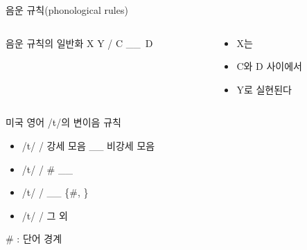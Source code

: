 \documentclass[11pt, aspectratio=169]{beamer}
\newcommand{\textds}[1]{{\ipafont #1}}
\begin{document}
\begin{frame}[t]{음운 규칙(phonological rules)}
    \begin{columns}
        \begin{column}[t]{0.46\textwidth}
            \begin{block}{음운 규칙의 일반화}
                X \rightarrow Y / C \_\_\ D 
            \end{block}            
        \end{column}
        \begin{column}[t]{0.47\textwidth}
            \begin{itemize}
                \item X는
                \item C와 D 사이에서
                \item Y로 실현된다
            \end{itemize}            
        \end{column}
    \end{columns}
    \begin{block}{미국 영어 \textds{/t/}의 변이음 규칙}
        \begin{itemize}
            \item \textds{/t/} \rightarrow \textds{[ɾ]} / 강세 모음 \_\_ 비강세 모음
            \item \textds{/t/} \rightarrow \textds{[tʰ]} / \# \_\_ 
            \item \textds{/t/} \rightarrow \textds{[ʔ]} / \_\_ \{\#, \textds{[n̩]}\}
            \item \textds{/t/} \rightarrow \textds{[t]} / 그 외
        \end{itemize}
    \end{block}
    \# : 단어 경계
\end{frame}
\end{document}
